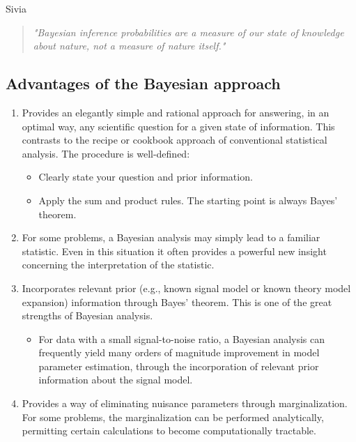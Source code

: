 \documentclass[%
oneside,                 %
final,                   %
10pt]{article}
\begin{document}
Sivia

\begin{quote}
\emph{"Bayesian inference probabilities are a measure of our state of knowledge about nature, not a measure of nature itself."}
\end{quote}


\subsection{Advantages of the Bayesian approach}
\begin{enumerate}
\item Provides an elegantly simple and rational approach for answering, in an optimal way, any scientific question for a given state of information. This contrasts to the recipe or cookbook approach of conventional statistical analysis. The procedure is well-defined:
\begin{itemize}

  \item Clearly state your question and prior information.

  \item Apply the sum and product rules. The starting point is always Bayes’ theorem.

\end{itemize}

\noindent
\item For some problems, a Bayesian analysis may simply lead to a familiar statistic. Even in this situation it often provides a powerful new insight concerning the interpretation of the statistic.

\item Incorporates relevant prior (e.g., known signal model or known theory model expansion) information through Bayes’ theorem. This is one of the great strengths of Bayesian analysis.
\begin{itemize}

  \item For data with a small signal-to-noise ratio, a Bayesian analysis can frequently yield many orders of magnitude improvement in model parameter estimation, through the incorporation of relevant prior information about the signal model.

\end{itemize}

\noindent
\item Provides a way of eliminating nuisance parameters through marginalization. For some problems, the marginalization can be performed analytically, permitting certain calculations to become computationally tractable.


\end{enumerate}
\end{document}
